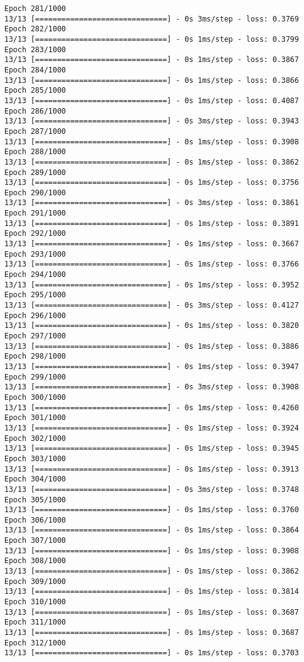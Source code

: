 \documentclass[11pt]{article}
\begin{document}
\begin{Verbatim}[commandchars=\\\{\}]
Epoch 281/1000
13/13 [==============================] - 0s 3ms/step - loss: 0.3769
Epoch 282/1000
13/13 [==============================] - 0s 1ms/step - loss: 0.3799
Epoch 283/1000
13/13 [==============================] - 0s 1ms/step - loss: 0.3867
Epoch 284/1000
13/13 [==============================] - 0s 1ms/step - loss: 0.3866
Epoch 285/1000
13/13 [==============================] - 0s 1ms/step - loss: 0.4087
Epoch 286/1000
13/13 [==============================] - 0s 3ms/step - loss: 0.3943
Epoch 287/1000
13/13 [==============================] - 0s 1ms/step - loss: 0.3908
Epoch 288/1000
13/13 [==============================] - 0s 1ms/step - loss: 0.3862
Epoch 289/1000
13/13 [==============================] - 0s 1ms/step - loss: 0.3756
Epoch 290/1000
13/13 [==============================] - 0s 3ms/step - loss: 0.3861
Epoch 291/1000
13/13 [==============================] - 0s 1ms/step - loss: 0.3891
Epoch 292/1000
13/13 [==============================] - 0s 1ms/step - loss: 0.3667
Epoch 293/1000
13/13 [==============================] - 0s 1ms/step - loss: 0.3766
Epoch 294/1000
13/13 [==============================] - 0s 1ms/step - loss: 0.3952
Epoch 295/1000
13/13 [==============================] - 0s 3ms/step - loss: 0.4127
Epoch 296/1000
13/13 [==============================] - 0s 1ms/step - loss: 0.3820
Epoch 297/1000
13/13 [==============================] - 0s 1ms/step - loss: 0.3886
Epoch 298/1000
13/13 [==============================] - 0s 1ms/step - loss: 0.3947
Epoch 299/1000
13/13 [==============================] - 0s 3ms/step - loss: 0.3908
Epoch 300/1000
13/13 [==============================] - 0s 1ms/step - loss: 0.4260
Epoch 301/1000
13/13 [==============================] - 0s 1ms/step - loss: 0.3924
Epoch 302/1000
13/13 [==============================] - 0s 1ms/step - loss: 0.3945
Epoch 303/1000
13/13 [==============================] - 0s 1ms/step - loss: 0.3913
Epoch 304/1000
13/13 [==============================] - 0s 3ms/step - loss: 0.3748
Epoch 305/1000
13/13 [==============================] - 0s 1ms/step - loss: 0.3760
Epoch 306/1000
13/13 [==============================] - 0s 1ms/step - loss: 0.3864
Epoch 307/1000
13/13 [==============================] - 0s 1ms/step - loss: 0.3908
Epoch 308/1000
13/13 [==============================] - 0s 1ms/step - loss: 0.3862
Epoch 309/1000
13/13 [==============================] - 0s 1ms/step - loss: 0.3814
Epoch 310/1000
13/13 [==============================] - 0s 1ms/step - loss: 0.3687
Epoch 311/1000
13/13 [==============================] - 0s 1ms/step - loss: 0.3687
Epoch 312/1000
13/13 [==============================] - 0s 1ms/step - loss: 0.3703

\end{Verbatim}
\end{document}
